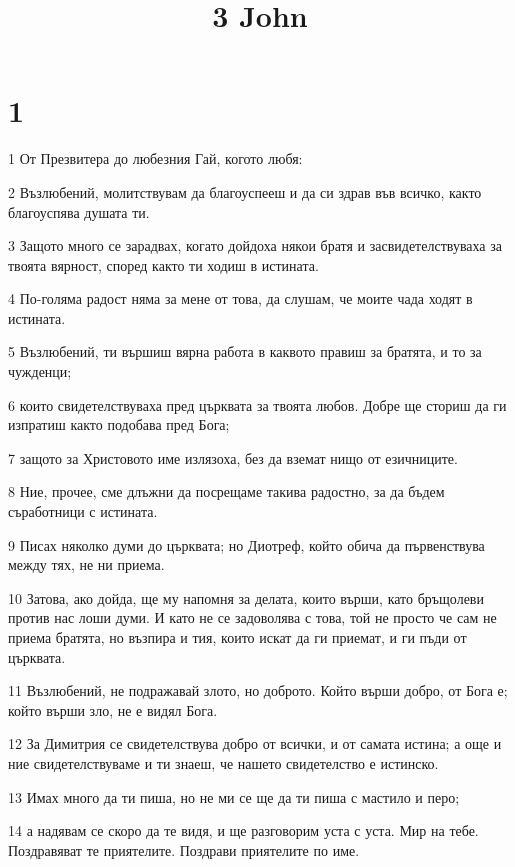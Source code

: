 

\title{3 John}


\chapter{1}

\par 1 От Презвитера до любезния Гай,  когото любя:
\par 2 Възлюбений, молитствувам да благоуспееш и да си здрав във всичко, както благоуспява душата ти.
\par 3 Защото много се зарадвах, когато дойдоха някои братя и засвидетелствуваха за твоята вярност, според както ти ходиш в истината.
\par 4 По-голяма радост няма за мене от това, да слушам, че моите чада ходят в истината.
\par 5 Възлюбений, ти вършиш вярна работа в каквото правиш за братята, и то за чужденци;
\par 6 които свидетелствуваха пред църквата за твоята любов. Добре ще сториш да ги изпратиш както подобава пред Бога;
\par 7 защото за Христовото име излязоха, без да вземат нищо от езичниците.
\par 8 Ние, прочее, сме длъжни да посрещаме такива радостно, за да бъдем съработници с истината.
\par 9 Писах няколко думи до църквата; но Диотреф, който обича да първенствува между тях, не ни приема.
\par 10 Затова, ако дойда, ще му напомня за делата, които върши, като бръщолеви против нас лоши думи. И като не се задоволява с това, той не просто че сам не приема братята, но възпира и тия, които искат да ги приемат, и ги пъди от църквата.
\par 11 Възлюбений, не подражавай злото, но доброто. Който върши добро, от Бога е; който върши зло, не е видял Бога.
\par 12 За Димитрия се свидетелствува добро от всички, и от самата истина; а още и ние свидетелствуваме и ти знаеш, че нашето свидетелство е истинско.
\par 13 Имах много да ти пиша, но не ми се ще да ти пиша с мастило и перо;
\par 14 а надявам се скоро да те видя, и ще разговорим уста с уста. Мир на тебе. Поздравяват те приятелите. Поздрави приятелите по име.


